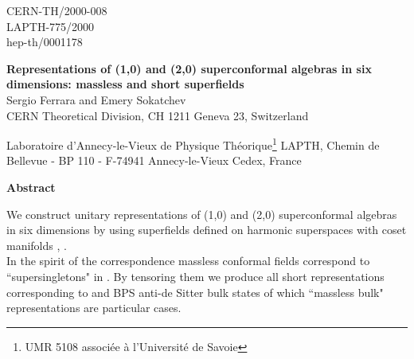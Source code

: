 \documentclass[a4paper,12pt]{article}
\begin{document}
\begin{titlepage}

\begin{flushright}

CERN-TH/2000-008\\ LAPTH-775/2000 \\ hep-th/0001178 

\end{flushright}

\vspace{.5cm} 

\begin{center}

{\Large\bf Representations of (1,0) and (2,0) superconformal 
algebras in six dimensions: massless and short superfields}\\ 
\vfill {\large  Sergio Ferrara\myHighlight{$^\dagger$}\coordHE{} and Emery 
Sokatchev\myHighlight{$^\ddagger$}\coordHE{} }\\ \vfill  \vspace{6pt} \myHighlight{$^\dagger$}\coordHE{} CERN 
Theoretical Division, CH 1211 Geneva 23, Switzerland 
\\ \vspace{6pt}

\myHighlight{$^\ddagger$}\coordHE{} Laboratoire d'Annecy-le-Vieux de Physique 
Th\'{e}orique\footnote[1]{UMR 5108 associ{\'e}e {\`a} 
 l'Universit{\'e} de Savoie} LAPTH, Chemin
de Bellevue - BP 110 - F-74941 Annecy-le-Vieux Cedex, France 



\end{center}

\vfill 



\begin{center}

{\bf Abstract} 

\end{center}
{\small We construct unitary representations  of (1,0) and (2,0) 
superconformal algebras in six dimensions by using superfields 
defined on harmonic superspaces with coset manifolds \coordHE{}, \coordHE{}.\\ In the spirit of the \coordHE{} 
correspondence massless conformal fields correspond to 
``supersingletons" in \coordHE{}. By tensoring them we produce all 
short representations corresponding to \coordHE{} and \coordHE{} BPS anti-de 
Sitter bulk states of which ``massless bulk" representations are 
particular cases.} 


\end{titlepage}
\end{document}
